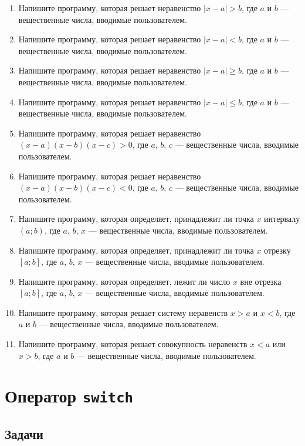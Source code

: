 \documentclass[12pt]{article}
\begin{document}
\begin{enumerate}
    \item Напишите программу, которая решает неравенство $|x - a| > b$, где $a$ и $b$ — вещественные числа, вводимые пользователем.
    \item Напишите программу, которая решает неравенство $|x - a| < b$, где $a$ и $b$ — вещественные числа, вводимые пользователем.
    \item Напишите программу, которая решает неравенство $|x - a| \geqslant b$, где $a$ и $b$ — вещественные числа, вводимые пользователем.
    \item Напишите программу, которая решает неравенство $|x - a| \leqslant b$, где $a$ и $b$ — вещественные числа, вводимые пользователем.
    \item Напишите программу, которая решает неравенство $(x - a)(x - b)(x - c) > 0$, где $a$, $b$, $c$ — вещественные числа, вводимые пользователем.
    \item Напишите программу, которая решает неравенство $(x - a)(x - b)(x - c) < 0$, где $a$, $b$, $c$ — вещественные числа, вводимые пользователем.
    \item Напишите программу, которая определяет, принадлежит ли точка $x$ интервалу $(a; b)$, где $a$, $b$, $x$ — вещественные числа, вводимые пользователем.
    \item Напишите программу, которая определяет, принадлежит ли точка $x$ отрезку $[a; b]$, где $a$, $b$, $x$ — вещественные числа, вводимые пользователем.
    \item Напишите программу, которая определяет, лежит ли число $x$ вне отрезка $[a; b]$, где $a$, $b$, $x$ — вещественные числа, вводимые пользователем.
    \item Напишите программу, которая решает систему неравенств $x > a$ и $x < b$, где $a$ и $b$ — вещественные числа, вводимые пользователем.
    \item Напишите программу, которая решает совокупность неравенств $x < a$ или $x > b$, где $a$ и $b$ — вещественные числа, вводимые пользователем.
\end{enumerate}


\section{Оператор \texttt{switch}}

\subsection*{Задачи}
\end{document}
